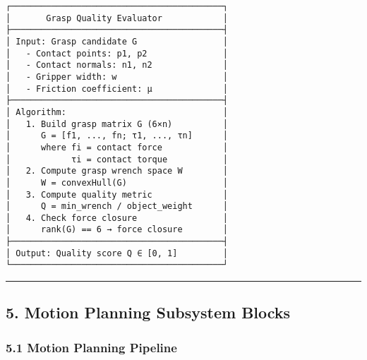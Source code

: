 \documentclass[
]{article}
\begin{document}
\begin{verbatim}
┌──────────────────────────────────────────┐
│       Grasp Quality Evaluator            │
├──────────────────────────────────────────┤
│ Input: Grasp candidate G                 │
│   - Contact points: p1, p2               │
│   - Contact normals: n1, n2              │
│   - Gripper width: w                     │
│   - Friction coefficient: μ              │
├──────────────────────────────────────────┤
│ Algorithm:                               │
│   1. Build grasp matrix G (6×n)          │
│      G = [f1, ..., fn; τ1, ..., τn]      │
│      where fi = contact force            │
│            τi = contact torque           │
│   2. Compute grasp wrench space W        │
│      W = convexHull(G)                   │
│   3. Compute quality metric              │
│      Q = min_wrench / object_weight      │
│   4. Check force closure                 │
│      rank(G) == 6 → force closure        │
├──────────────────────────────────────────┤
│ Output: Quality score Q ∈ [0, 1]         │
└──────────────────────────────────────────┘
\end{verbatim}

\begin{center}\rule{0.5\linewidth}{0.5pt}\end{center}

\hypertarget{motion-planning-subsystem-blocks}{%
\subsection{5. Motion Planning Subsystem
Blocks}\label{motion-planning-subsystem-blocks}}

\hypertarget{motion-planning-pipeline}{%
\subsubsection{5.1 Motion Planning
Pipeline}\label{motion-planning-pipeline}}
\end{document}
